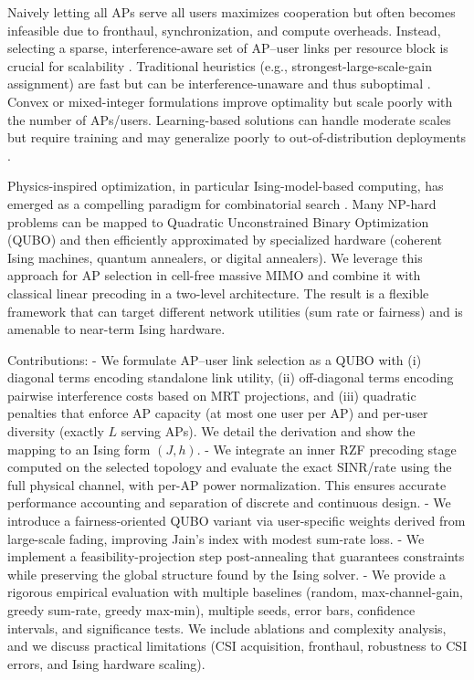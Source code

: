{Naively letting all APs serve all users maximizes cooperation but often becomes infeasible due to fronthaul, synchronization, and compute overheads. Instead, selecting a sparse, interference-aware set of AP–user links per resource block is crucial for scalability \cite{interdonato2019scalability,chen2020structured}. Traditional heuristics (e.g., strongest-large-scale-gain assignment) are fast but can be interference-unaware and thus suboptimal \cite{zhang2019cell}. Convex or mixed-integer formulations improve optimality but scale poorly with the number of APs/users. Learning-based solutions can handle moderate scales but require training and may generalize poorly to out-of-distribution deployments \cite{elsherif2022resource,zappone2021uplink}.

Physics-inspired optimization, in particular Ising-model-based computing, has emerged as a compelling paradigm for combinatorial search \cite{lucas2014ising,mcmahon2016fully,inagaki2016coherent,kasi2021resource,grassl2022ising}. Many NP-hard problems can be mapped to Quadratic Unconstrained Binary Optimization (QUBO) and then efficiently approximated by specialized hardware (coherent Ising machines, quantum annealers, or digital annealers). We leverage this approach for AP selection in cell-free massive MIMO and combine it with classical linear precoding in a two-level architecture. The result is a flexible framework that can target different network utilities (sum rate or fairness) and is amenable to near-term Ising hardware.

Contributions:
- We formulate AP–user link selection as a QUBO with (i) diagonal terms encoding standalone link utility, (ii) off-diagonal terms encoding pairwise interference costs based on MRT projections, and (iii) quadratic penalties that enforce AP capacity (at most one user per AP) and per-user diversity (exactly $L$ serving APs). We detail the derivation and show the mapping to an Ising form $(J,h)$.
- We integrate an inner RZF precoding stage computed on the selected topology and evaluate the exact SINR/rate using the full physical channel, with per-AP power normalization. This ensures accurate performance accounting and separation of discrete and continuous design.
- We introduce a fairness-oriented QUBO variant via user-specific weights derived from large-scale fading, improving Jain’s index with modest sum-rate loss. 
- We implement a feasibility-projection step post-annealing that guarantees constraints while preserving the global structure found by the Ising solver.
- We provide a rigorous empirical evaluation with multiple baselines (random, max-channel-gain, greedy sum-rate, greedy max-min), multiple seeds, error bars, confidence intervals, and significance tests. We include ablations and complexity analysis, and we discuss practical limitations (CSI acquisition, fronthaul, robustness to CSI errors, and Ising hardware scaling).

}

